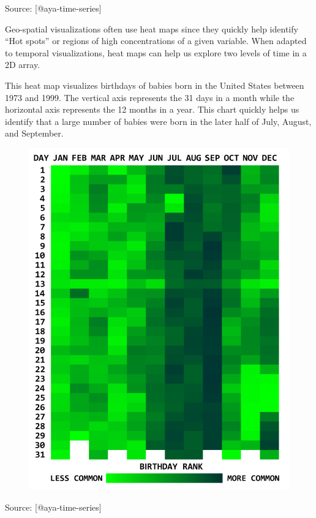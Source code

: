 \documentclass[]{book}
\theoremstyle{definition}
\theoremstyle{definition}
\theoremstyle{definition}
\theoremstyle{remark}
\begin{document}
Source: {[}@aya-time-series{]}

Geo-spatial visualizations often use heat maps since they quickly help
identify ``Hot spots'' or regions of high concentrations of a given
variable. When adapted to temporal visualizations, heat maps can help us
explore two levels of time in a 2D array.

This heat map visualizes birthdays of babies born in the United States
between 1973 and 1999. The vertical axis represents the 31 days in a
month while the horizontal axis represents the 12 months in a year. This
chart quickly helps us identify that a large number of babies were born
in the later half of July, August, and September.

\begin{figure}
\centering
\includegraphics{images/aya-heat-map.png}
\caption{}
\end{figure}

Source: {[}@aya-time-series{]}
\end{document}
